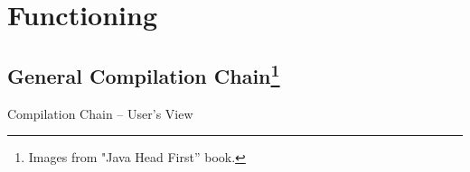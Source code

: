 \documentclass[English,c,%
hyperref={%
    pdftitle={FISA-DE2 OOP in Java},%
    pdfauthor={Muller, Gravier, Laforest, Subercaze},%
    pdfsubject={OOP in Java},%
    pdfkeywords={OOP, Java},%
    colorlinks=true,%
    urlcolor=blue,%
    linkcolor=%
    },%
xcolor={pdftex,svgnames} %
]{beamer}
\begin{document}



\section{Functioning}

\subsection{General Compilation Chain\footnote{Images from "Java Head First'' book.}}

\begin{frame}{Compilation Chain -- User's View}


\end{frame}
\end{document}
